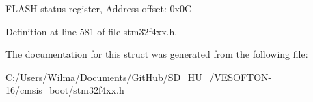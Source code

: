 F\+L\+A\+SH status register, Address offset\+: 0x0C 

Definition at line 581 of file stm32f4xx.\+h.



The documentation for this struct was generated from the following file\+:\begin{DoxyCompactItemize}
\item 
C\+:/\+Users/\+Wilma/\+Documents/\+Git\+Hub/\+S\+D\+\_\+\+H\+U\+\_/\+V\+E\+S\+O\+F\+T\+O\+N-\/16/cmsis\+\_\+boot/\hyperlink{stm32f4xx_8h}{stm32f4xx.\+h}\end{DoxyCompactItemize}
